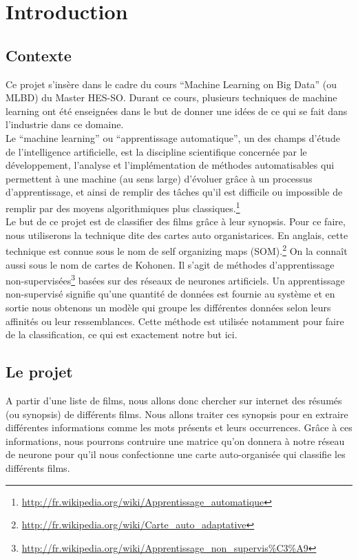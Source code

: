 \chapter{Introduction}

\section{Contexte}

Ce projet s'insère dans le cadre du cours ``Machine Learning on Big Data'' (ou MLBD) du Master HES-SO. Durant ce cours, plusieurs techniques de machine learning ont été enseignées dans le but de donner une idées de ce qui se fait dans l'industrie dans ce domaine. \\

Le ``machine learning'' ou ``apprentissage automatique'', un des champs d'étude de l'intelligence artificielle, est la discipline scientifique concernée par le développement, l'analyse et l'implémentation de méthodes automatisables qui permettent à une machine (au sens large) d'évoluer grâce à un processus d'apprentissage, et ainsi de remplir des tâches qu'il est difficile ou impossible de remplir par des moyens algorithmiques plus classiques.\footnote{\url{http://fr.wikipedia.org/wiki/Apprentissage\_automatique}} \\


Le but de ce projet est de classifier des films grâce à leur synopsis. Pour ce faire, nous utiliserons la technique dite des cartes auto organistarices. En anglais, cette technique est connue sous le nom de self organizing maps (SOM).\footnote{\url{http://fr.wikipedia.org/wiki/Carte\_auto\_adaptative}} On la connaît aussi sous le nom de cartes de Kohonen. Il s'agit de méthodes d'apprentissage non-supervisées\footnote{\url{http://fr.wikipedia.org/wiki/Apprentissage\_non\_supervis\%C3\%A9}} basées sur des réseaux de neurones artificiels. Un apprentissage non-supervisé signifie qu'une quantité de données est fournie au système et en sortie nous obtenons un modèle qui groupe les différentes données selon leurs affinités ou leur ressemblances. Cette méthode est utilisée notamment pour faire de la classification, ce qui est exactement notre but ici.

\newpage
\section{Le projet}

A partir d'une liste de films, nous allons donc chercher sur internet des résumés (ou synopsis) de différents films. Nous allons traiter ces synopsis pour en extraire différentes informations comme les mots présents et leurs occurrences. Grâce à ces informations, nous pourrons contruire une matrice qu'on donnera à notre réseau de neurone pour qu'il nous confectionne une carte auto-organisée qui classifie les différents films.\\

